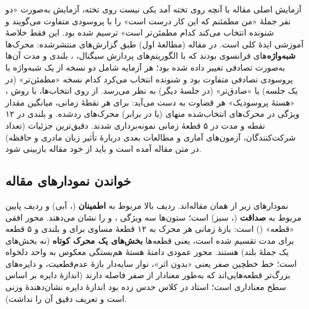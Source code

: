 
\begin{addedbox}{آزمایش اصلی مقاله با آنچه روی تخته آمد یکی نیست}
روی تخته، آزمایش به‌صورت «دو نفر جملهٔ «من مطمئنم که این کار درست است» را با پروسودی متفاوت می‌گویند و شنونده انتخاب می‌کند کدام مطمئن‌تر است» ترسیم شده بود. این فقط خلاصهٔ آموزشی ایدهٔ کلی است. در مقاله (مطالعهٔ اول) طبق گزارش‌های منتشرشده: محرک‌ها \textbf{شبه‌واژه}‌های فرانسوی بودند که با الگوریتم‌های پردازش سیگنال، ، بلندی و مدت آن‌ها به‌صورت تصادفی تغییر داده شده بود؛ هر آزمایه شامل دو نسخه از یک شبه‌واژه با پروسودی تصادفی متفاوت بود و شنونده انتخاب می‌کرد کدام نسخه «مطمئن‌تر» (در یک جلسه) یا «صادق‌تر» (در جلسهٔ دیگر) به نظر می‌رسد. از روی انتخاب‌ها، با روش ، «هستهٔ پروسودیک» هر قضاوت به دست می‌آید: برای هر نقطهٔ زمانی، میانگین مقدار ویژگی در محرک‌های انتخاب‌شده منهای (یا در برابر) محرک‌های ردشده.  و بلندی در ۱۲ نقطه و مدت در ۵ قطعهٔ زمانی نمونه‌برداری شدند. دقیق‌ترین جزئیات (تعداد شرکت‌کنندگان، آزمون‌های آماری و مطالعات بعدی دربارهٔ تأثیر زبان مادری و حافظه) در متن مقاله آمده است و باید از خود مقاله بازبینی شود.
\end{addedbox}

\subsection{خواندن نمودارهای مقاله}
نمودارهای زیر از همان مقاله‌اند. ردیف بالا مربوط به \textbf{اطمینان} (، آبی) و ردیف پایین مربوط به \textbf{صداقت} (، سبز) است؛ ستون‌ها سه ویژگی ،  و  را نشان می‌دهند. محور افقی «قطعه» () است: بازهٔ زمانی هر محرک به ۱۲ قطعهٔ مساوی برای  و بلندی و ۵ قطعه برای مدت تقسیم شده است، یعنی قطعه‌ها \textbf{بخش‌های یک محرک کوتاه} (نه بخش‌های یک جملهٔ بلند) هستند. محور عمودی  دامنهٔ هستهٔ هم‌بستگی معکوس به واحد دلخواه است؛ خط خطچین صفر یعنی «بدون اثر»، نوار سایه‌دار بازهٔ عدم‌قطعیت، و دایره‌های بزرگ‌تر قطعه‌هایی‌اند که به‌طور معنادار از صفر فاصله دارند (اندازهٔ دایره بر اساس سطح معناداری است؛ استاد در کلاس حدس زده بود اندازهٔ دایره نشان‌دهندهٔ وزنی است و تعریف دقیق آن را نداشت).


